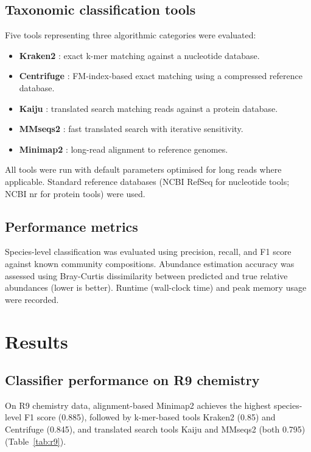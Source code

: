 \documentclass[11pt]{article}
\begin{document}
\subsection{Taxonomic classification tools}
Five tools representing three algorithmic categories were evaluated:

\begin{itemize}
  \item \textbf{Kraken2} \citep{wood2019}: exact k-mer matching against a nucleotide database.
  \item \textbf{Centrifuge} \citep{kim2016}: FM-index-based exact matching using a compressed reference database.
  \item \textbf{Kaiju} \citep{menzel2016}: translated search matching reads against a protein database.
  \item \textbf{MMseqs2} \citep{steinegger2017}: fast translated search with iterative sensitivity.
  \item \textbf{Minimap2} \citep{li2018}: long-read alignment to reference genomes.
\end{itemize}

All tools were run with default parameters optimised for long reads where applicable. Standard reference databases (NCBI RefSeq for nucleotide tools; NCBI nr for protein tools) were used.

\subsection{Performance metrics}
Species-level classification was evaluated using precision, recall, and F1 score against known community compositions. Abundance estimation accuracy was assessed using Bray-Curtis dissimilarity between predicted and true relative abundances (lower is better). Runtime (wall-clock time) and peak memory usage were recorded.

\section{Results}

\subsection{Classifier performance on R9 chemistry}

On R9 chemistry data, alignment-based Minimap2 achieves the highest species-level F1 score (0.885), followed by k-mer-based tools Kraken2 (0.85) and Centrifuge (0.845), and translated search tools Kaiju and MMseqs2 (both 0.795) (Table~\ref{tab:r9}).
\end{document}
